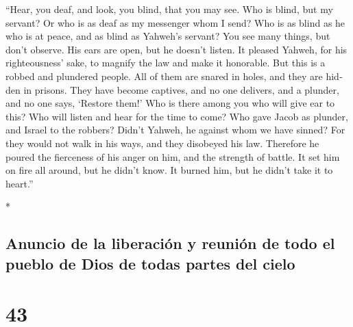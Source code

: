 \begin{paracol}{2}
\begin{otherlanguage}{english}
 ``Hear, you deaf, and look, you blind, that you may see.
 Who is blind, but my servant? Or who is as deaf as my
messenger whom I send? Who is as blind as he who is at peace, and as
blind as Yahweh's servant?  You see many things, but
don't observe. His ears are open, but he doesn't listen. 
It pleased Yahweh, for his righteousness' sake, to magnify the law and
make it honorable.  But this is a robbed and plundered
people. All of them are snared in holes, and they are hidden in prisons.
They have become captives, and no one delivers, and a plunder, and no
one says, `Restore them!'  Who is there among you who
will give ear to this? Who will listen and hear for the time to come?
 Who gave Jacob as plunder, and Israel to the robbers?
Didn't Yahweh, he against whom we have sinned? For they would not walk
in his ways, and they disobeyed his law.  Therefore he
poured the fierceness of his anger on him, and the strength of battle.
It set him on fire all around, but he didn't know. It burned him, but he
didn't take it to heart.''

\end{otherlanguage}

\switchcolumn[0]*

\hypertarget{anuncio-de-la-liberaciuxf3n-y-reuniuxf3n-de-todo-el-pueblo-de-dios-de-todas-partes-del-cielo}{%
\subsection{Anuncio de la liberación y reunión de todo el pueblo de Dios
de todas partes del
cielo}\label{anuncio-de-la-liberaciuxf3n-y-reuniuxf3n-de-todo-el-pueblo-de-dios-de-todas-partes-del-cielo}}

\hypertarget{section-84}{%
\section{43}\label{section-84}}


\end{paracol}
